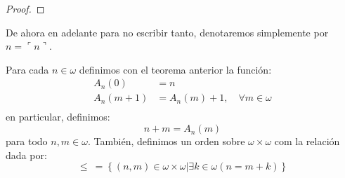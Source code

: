 \documentclass[12pt]{report}
\newcounter{it}
\theoremstyle{largebreak}
\newcommand{\winecomma}[1]{\ensuremath{\ulcorner#1\urcorner}}
\begin{document}
    \begin{proof}
        
    \end{proof}

    \begin{obs}
        De ahora en adelante para no escribir tanto, denotaremos simplemente por $n=\winecomma{n}$.
    \end{obs}

    \begin{mydef}
        Para cada $n\in\omega$ definimos con el teorema anterior la función:
        \begin{equation*}
            \begin{split}
                A_n(0)&=n\\
                A_n(m+1)&=A_n(m)+1,\quad\forall m\in\omega \\
            \end{split}
        \end{equation*}
        en particular, definimos:
        \begin{equation*}
            n+m=A_n(m)
        \end{equation*}
        para todo $n,m\in\omega$. También, definimos un orden sobre $\omega\times\omega$ com la relación dada por:
        \begin{equation*}
            \leq \:= \left\{(n,m)\in\omega\times\omega\Big|\exists k\in\omega(n=m+k)\right\}
        \end{equation*}
    \end{mydef}


    
\end{document}
